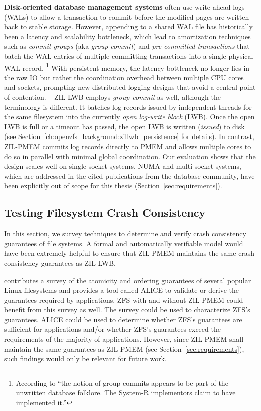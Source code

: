 \documentclass[12pt,a4paper,twoside]{book}
\begin{document}
\textbf{Disk-oriented database management systems} often use write-ahead logs (WALs) to allow a transaction to commit before the modified pages are written back to stable storage.
However, appending to a shared WAL file has historically been a latency and scalability bottleneck, which lead to amortization techniques such as \textit{commit groups} (aka \textit{group commit}) and \textit{pre-committed transactions} that batch the WAL entries of multiple committing transactions into a single physical WAL record.%
\footnote{According to \cite{dewittImplementationTechniquesMain1984} ``the notion of group commits appears to be part of the unwritten database folklore. The System-R implementors claim to have implemented it.''}
With persistent memory, the latency bottleneck no longer lies in the raw IO but rather the coordination overhead between multiple CPU cores and sockets, prompting new distributed logging designs that avoid a central point of contention.%
~\cite{fangHighPerformanceDatabase2011,pelleyStorageManagementNVRAM2013,johnsonAetherScalableApproach2010}
ZIL-LWB employs \textit{group commit} as well, although the terminology is different.
It batches log records issued by independent threads for the same filesystem into the currently \textit{open} \textit{log-write block} (LWB).
Once the open LWB is full or a timeout has passed, the open LWB is written (\textit{issued}) to disk (see Section~\ref{ch:openzfs_background:zillwb_persistence} for details).
In contrast, ZIL-PMEM commits log records directly to PMEM and allows multiple cores to do so in parallel with minimal global coordination.
Our evaluation shows that the design scales well on single-socket systems.
NUMA and multi-socket systems, which are addressed in the cited publications from the database community, have been explicitly out of scope for this thesis (Section~\ref{sec:requirements}).

\subsection{Testing Filesystem Crash Consistency}
In this section, we survey techniques to determine and verify crash consistency guarantees of file systems.
A formal and automatically verifiable model would have been extremely helpful to ensure that ZIL-PMEM maintains the same crash consistency guarantees as ZIL-LWB.

 contributes a survey of the atomicity and ordering guarantees of several popular Linux filesystems and provides a tool called ALICE to validate or derive the guarantees required by applications.
ZFS with and without ZIL-PMEM could benefit from this survey as well.
The survey could be used to characterize ZFS’s guarantees.
ALICE could be used to determine whether ZFS’s guarantees are sufficient for applications and/or whether ZFS’s guarantees exceed the requirements of the majority of applications.
However, since ZIL-PMEM shall maintain the same guarantees as ZIL-PMEM (see Section~\ref{sec:requirements}), such findings would only be relevant for future work.
\end{document}
